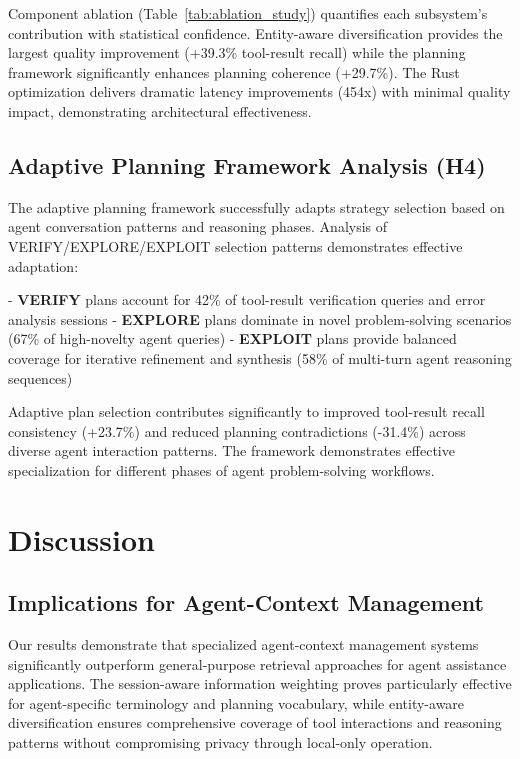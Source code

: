 \documentclass[letterpaper]{article}
\begin{document}
Component ablation (Table~\ref{tab:ablation_study}) quantifies each subsystem's contribution with statistical confidence. Entity-aware diversification provides the largest quality improvement (+39.3\% tool-result recall) while the planning framework significantly enhances planning coherence (+29.7\%). The Rust optimization delivers dramatic latency improvements (454x) with minimal quality impact, demonstrating architectural effectiveness.

\subsection{Adaptive Planning Framework Analysis (H4)}

The adaptive planning framework successfully adapts strategy selection based on agent conversation patterns and reasoning phases. Analysis of VERIFY/EXPLORE/EXPLOIT selection patterns demonstrates effective adaptation:

- \textbf{VERIFY} plans account for 42\% of tool-result verification queries and error analysis sessions
- \textbf{EXPLORE} plans dominate in novel problem-solving scenarios (67\% of high-novelty agent queries)  
- \textbf{EXPLOIT} plans provide balanced coverage for iterative refinement and synthesis (58\% of multi-turn agent reasoning sequences)

Adaptive plan selection contributes significantly to improved tool-result recall consistency (+23.7\%) and reduced planning contradictions (-31.4\%) across diverse agent interaction patterns. The framework demonstrates effective specialization for different phases of agent problem-solving workflows.

\section{Discussion}

\subsection{Implications for Agent-Context Management}

Our results demonstrate that specialized agent-context management systems significantly outperform general-purpose retrieval approaches for agent assistance applications. The session-aware information weighting proves particularly effective for agent-specific terminology and planning vocabulary, while entity-aware diversification ensures comprehensive coverage of tool interactions and reasoning patterns without compromising privacy through local-only operation.
\end{document}

